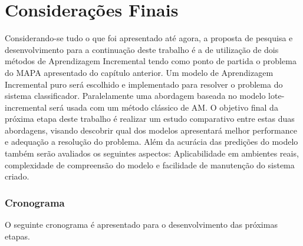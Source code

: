 \chapter{Considerações Finais}

Considerando-se tudo o que foi apresentado até agora, a proposta de pesquisa e desenvolvimento para a continuação deste trabalho é a de utilização de dois métodos de Aprendizagem Incremental tendo como ponto de partida o problema do MAPA apresentado do capítulo anterior. Um modelo de Aprendizagem Incremental puro será escolhido e implementado para resolver o problema do sistema classificador. Paralelamente uma abordagem baseada no modelo lote-incremental será usada com um método clássico de AM. O objetivo final da próxima etapa deste trabalho é realizar um estudo comparativo entre estas duas abordagens, visando descobrir qual dos modelos apresentará melhor performance e adequação a resolução do problema. Além da acurácia das predições do modelo também serão avaliados os seguintes aspectos: Aplicabilidade em ambientes reais, complexidade de compreensão do modelo e facilidade de manutenção do sistema criado.

\subsection{Cronograma}
O seguinte cronograma é apresentado para o desenvolvimento das próximas etapas. 


